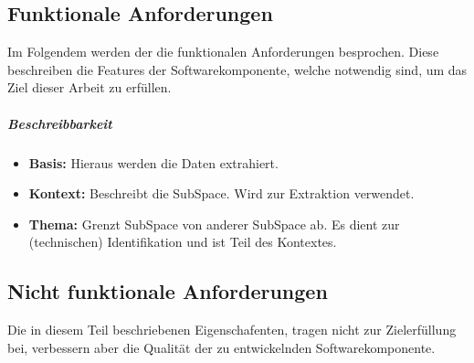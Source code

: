 \documentclass[a4paper]{article}
\begin{document}
	\subsection{Funktionale Anforderungen}
	
	Im Folgendem werden der die funktionalen Anforderungen besprochen. Diese
	beschreiben die Features der Softwarekomponente, welche notwendig sind,
	um das Ziel dieser Arbeit zu erfüllen.
	
	\subparagraph{Beschreibbarkeit}
	
	\begin{itemize}
		\item \textbf{Basis:} Hieraus werden die Daten extrahiert.
		\item \textbf{Kontext:} Beschreibt die SubSpace. Wird zur Extraktion
			  verwendet.
		\item \textbf{Thema:} Grenzt SubSpace von anderer SubSpace ab. Es dient 				  zur (technischen) Identifikation und ist Teil des Kontextes.
	\end{itemize} 	
	
	\subsection{Nicht funktionale Anforderungen}
	
	Die in diesem Teil beschriebenen Eigenschafenten, tragen nicht zur
	Zielerfüllung bei, verbessern aber die Qualität der zu entwickelnden
	Softwarekomponente.
	
	\newpage
	\listoffigures
	\newpage
	\listoftables
\end{document}
